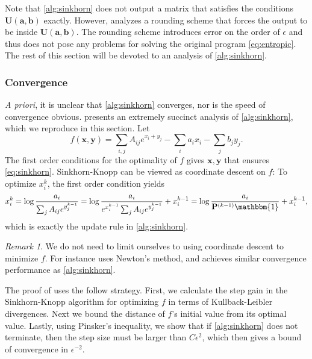 \documentclass{article}
\renewcommand{\b}{\mathbf}
\newcommand{\one}{\mathbbm{1}}
\theoremstyle{definition}
\theoremstyle{remark}
\newtheorem{rmk}{Remark}
\newcommand{\feasible}{\b U(\b a, \b b)}
\begin{document}
Note that \cref{alg:sinkhorn} does not output a matrix that satisfies the
 conditions $\feasible$ exactly. However, \cite[Algorithm 2]{altschuler2017near}
 analyzes a rounding scheme that forces the output to be inside $\feasible$. The
 rounding scheme introduces error on the order of $\epsilon$ and thus does not
 pose any problems for solving the original program \eqref{eq:entropic}. The
 rest of this section will be devoted to an analysis of \cref{alg:sinkhorn}.

\subsubsection{Convergence}
\emph{A priori}, it is unclear that \cref{alg:sinkhorn} converges, nor is the
 speed of convergence obvious. 
\cite{altschuler2017near} presents an extremely succinct analysis of 
\cref{alg:sinkhorn}, which we reproduce in this section. Let \[
f(\b x, \b y) = \sum_{i,j} A_{ij} e^{x_i + y_j} - \sum_i a_i x_i - \sum_j b_j
 y_j.
\] 
The first order conditions for the optimality of $f$ gives $\b x, \b y$
 that ensures \eqref{eq:sinkhorn}. Sinkhorn-Knopp can be viewed as coordinate
 descent on $f$: To optimize $x_i^k$, the first order condition yields \[
x_i^k = \log \frac{a_i}{\sum_j A_{ij} e^{y_j^{k-1}}} = \log \frac{a_i}{e^
{x_i^{k-1}}\sum_j A_{ij} e^{y_j^{k-1}}} + x_i^{k-1} = \log \frac{a_i}{\b P^{
(k-1)}\one} + x_i^{k-1},
\]
which is exactly the update rule in \cref{alg:sinkhorn}. 

\begin{rmk}
  We do not need to limit ourselves to using coordinate descent to minimize $f$.
 For instance
\cite{brauer2017sinkhorn} uses Newton's method, and achieves similar convergence
 performance as \cref{alg:sinkhorn}.
\end{rmk}

The proof of \cite{altschuler2017near} uses the follow strategy. First, we
 calculate the step gain in the Sinkhorn-Knopp algorithm for optimizing $f$ in
 terms of Kullback-Leibler divergences.
 Next we bound the distance of $f$'s initial value from its optimal value.
 Lastly, using Pinsker's inequality, we show that if \cref{alg:sinkhorn} does
 not terminate, then the step size must be larger than $C\epsilon^{2}$, which
 then gives a bound of convergence in $\epsilon^{-2}$.
\end{document}
